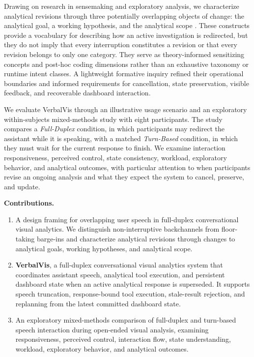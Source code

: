 \documentclass[journal]{IEEEtran}
\begin{document}
Drawing on research in sensemaking and exploratory analysis, we characterize
analytical revisions through three potentially overlapping objects of change:
the analytical goal, a working hypothesis, and the analytical scope
\cite{pirolli2005sensemaking,klein2007dataframe,
bates1989berrypicking,battle2019characterizing}. These constructs provide a
vocabulary for describing how an active investigation is redirected, but they
do not imply that every interruption constitutes a revision or that every
revision belongs to only one category. They serve as theory-informed
sensitizing concepts and post-hoc coding dimensions rather than an exhaustive
taxonomy or runtime intent classes. A lightweight formative inquiry refined
their operational boundaries and informed requirements for cancellation, state
preservation, visible feedback, and recoverable dashboard interaction.

We evaluate VerbalVis through an illustrative usage scenario and an exploratory
within-subjects mixed-methods study with eight participants. The study compares
a \emph{Full-Duplex} condition, in which participants may redirect the assistant
while it is speaking, with a matched \emph{Turn-Based} condition, in which they
must wait for the current response to finish. We examine interaction
responsiveness, perceived control, state consistency, workload, exploratory
behavior, and analytical outcomes, with particular attention to when
participants revise an ongoing analysis and what they expect the system to
cancel, preserve, and update.

\textbf{Contributions.}
\begin{enumerate}
\setlength{\itemsep}{1pt}
\setlength{\parskip}{0pt}

\item A design framing for overlapping user speech in full-duplex
conversational visual analytics. We distinguish non-interruptive backchannels
from floor-taking barge-ins and characterize analytical revisions through
changes to analytical goals, working hypotheses, and analytical scope.

\item \textbf{VerbalVis}, a full-duplex conversational visual analytics system
that coordinates assistant speech, analytical tool execution, and persistent
dashboard state when an active analytical response is superseded. It supports
speech truncation, response-bound tool execution, stale-result rejection, and
replanning from the latest committed dashboard state.

\item An exploratory mixed-methods comparison of full-duplex and turn-based
speech interaction during open-ended visual analysis, examining
responsiveness, perceived control, interaction flow, state understanding,
workload, exploratory behavior, and analytical outcomes.

\end{enumerate}
\end{document}
